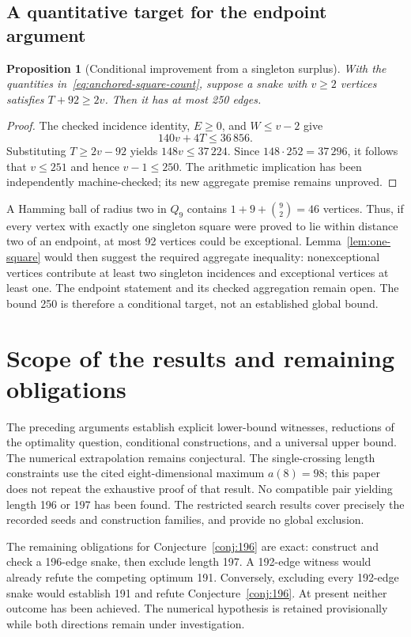 \documentclass[11pt,a4paper]{article}
\newtheorem{proposition}[theorem]{Proposition}
\theoremstyle{definition}
\theoremstyle{remark}
\newcommand{\Q}{Q}
\begin{document}
\subsection{A quantitative target for the endpoint argument}
\begin{proposition}[Conditional improvement from a singleton surplus]
With the quantities in~\eqref{eq:anchored-square-count}, suppose a snake with $v\ge2$ vertices satisfies $T+92\ge2v$. Then it has at most 250 edges.
\end{proposition}
\begin{proof}
The checked incidence identity, $E\ge0$, and $W\le v-2$ give
\[
140v+4T\le36\,856.
\]
Substituting $T\ge2v-92$ yields $148v\le37\,224$. Since $148\cdot252=37\,296$, it follows that $v\le251$ and hence $v-1\le250$. The arithmetic implication has been independently machine-checked; its new aggregate premise remains unproved.
\end{proof}
A Hamming ball of radius two in $\Q_9$ contains $1+9+\binom92=46$ vertices. Thus, if every vertex with exactly one singleton square were proved to lie within distance two of an endpoint, at most 92 vertices could be exceptional. Lemma~\ref{lem:one-square} would then suggest the required aggregate inequality: nonexceptional vertices contribute at least two singleton incidences and exceptional vertices at least one. The endpoint statement and its checked aggregation remain open. The bound 250 is therefore a conditional target, not an established global bound.

\section{Scope of the results and remaining obligations}
The preceding arguments establish explicit lower-bound witnesses, reductions of the optimality question, conditional constructions, and a universal upper bound. The numerical extrapolation remains conjectural. The single-crossing length constraints use the cited eight-dimensional maximum $a(8)=98$; this paper does not repeat the exhaustive proof of that result. No compatible pair yielding length 196 or 197 has been found. The restricted search results cover precisely the recorded seeds and construction families, and provide no global exclusion.

The remaining obligations for Conjecture~\ref{conj:196} are exact: construct and check a 196-edge snake, then exclude length 197. A 192-edge witness would already refute the competing optimum 191. Conversely, excluding every 192-edge snake would establish 191 and refute Conjecture~\ref{conj:196}. At present neither outcome has been achieved. The numerical hypothesis is retained provisionally while both directions remain under investigation.
\end{document}
